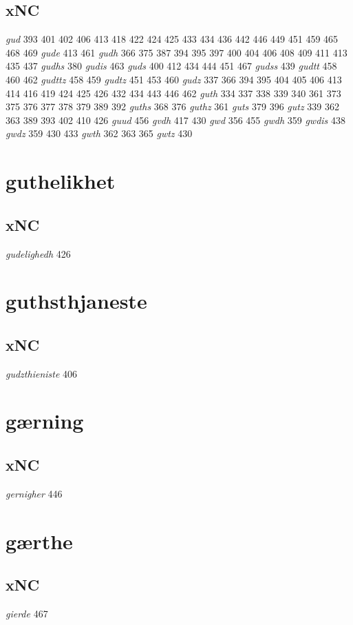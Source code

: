 \documentclass[a4paper,twocolumn]{article}
\begin{document}
\subsection{xNC}
\label{sec:orgd50d06d}
\emph{gud} 393 401 402 406 413 418 422 424 425 433 434 436 442 446 449 451 459 465 468 469 \emph{gude} 413 461 \emph{gudh} 366 375 387 394 395 397 400 404 406 408 409 411 413 435 437 \emph{gudhs} 380 \emph{gudis} 463 \emph{guds} 400 412 434 444 451 467 \emph{gudss} 439 \emph{gudtt} 458 460 462 \emph{gudttz} 458 459 \emph{gudtz} 451 453 460 \emph{gudz} 337 366 394 395 404 405 406 413 414 416 419 424 425 426 432 434 443 446 462 \emph{guth} 334 337 338 339 340 361 373 375 376 377 378 379 389 392 \emph{guths} 368 376 \emph{guthz} 361 \emph{guts} 379 396 \emph{gutz} 339 362 363 389 393 402 410 426 \emph{guud} 456 \emph{gvdh} 417 430 \emph{gwd} 356 455 \emph{gwdh} 359 \emph{gwdis} 438 \emph{gwdz} 359 430 433 \emph{gwth} 362 363 365 \emph{gwtz} 430 
\section{guthelikhet}
\label{sec:orgfebc57f}
\subsection{xNC}
\label{sec:orgfa586c2}
\emph{gudelighedh} 426 
\section{guthsthjaneste}
\label{sec:org0bf15f5}
\subsection{xNC}
\label{sec:org2ff5d82}
\emph{gudzthieniste} 406 
\section{gærning}
\label{sec:orgd5882bf}
\subsection{xNC}
\label{sec:org5dabc44}
\emph{gernigher} 446 
\section{gærthe}
\label{sec:org540127d}
\subsection{xNC}
\label{sec:org4ca82ab}
\emph{gierde} 467 
\end{document}
